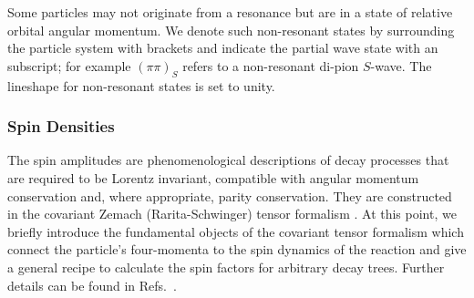 
Some particles may not originate from a resonance but are in a state of relative orbital angular momentum.
We denote such non-resonant states by surrounding the particle system with brackets  and indicate the partial wave state with an subscript;
for example $(\pi \pi)_S$ refers to a non-resonant di-pion $S$-wave.
The lineshape for non-resonant states is set to unity.

\subsubsection{Spin Densities}

The spin amplitudes are phenomenological descriptions
of decay processes that 
are required to be Lorentz invariant,
compatible with angular momentum conservation and,
where appropriate, parity conservation.
They are constructed in the covariant Zemach (Rarita-Schwinger) tensor formalism
\cite{Zemach,Rarita,helicity3}.
At this point, we briefly introduce 
the fundamental objects of the covariant tensor formalism 
which connect the particle's four-momenta to the spin dynamics of the reaction
and give a general recipe to calculate the spin factors for arbitrary decay trees.
Further details can be found in Refs.~\cite{Zou, Filippini}.

